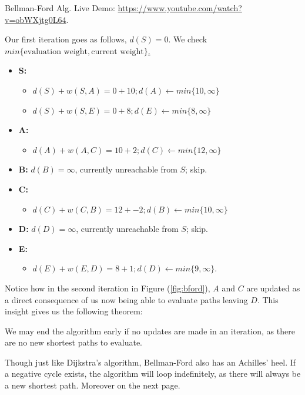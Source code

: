 \vspace{-1em}
\begin{Tip}
    Bellman-Ford Alg. Live Demo: \url{https://www.youtube.com/watch?v=obWXjtg0L64}.
\end{Tip}
\noindent
Our first iteration goes as follows, $d(S)=0$. We check \underline{$min\{\text{evaluation weight},\text{current weight}\}$.}
\begin{itemize}
    \item \textbf{S:}
    \vspace{-2em}
    \begin{itemize}
        \item [] $d(S)+w(S,A)=0+10; d(A)\gets min\{10,\infty\}$
        \item [] $d(S)+w(S,E)=0+8; d(E)\gets min\{8,\infty\}$
    \end{itemize}
    \item \textbf{A:}
    \vspace{-2em}
    \begin{itemize}
        \item [] $d(A)+w(A,C)=10+2; d(C)\gets min\{12,\infty\}$
    \end{itemize}
    \item \textbf{B:} \hspace{.5em} $d(B)=\infty$, currently unreachable from $S$; skip.
    \item \textbf{C:}
    \vspace{-2em}
    \begin{itemize}
        \item [] $d(C)+w(C,B)=12+-2; d(B)\gets min\{10,\infty\}$
    \end{itemize}
    \item \textbf{D:} \hspace{.5em} $d(D)=\infty$, currently unreachable from $S$; skip.
    \item \textbf{E:}
    \vspace{-2em}
    \begin{itemize}
        \item [] $d(E)+w(E,D)=8+1; d(D)\gets min\{9,\infty\}$.
    \end{itemize}
\end{itemize}
\noindent
Notice how in the second iteration in Figure (\ref{fig:bford}), $A$ and $C$ are updated as a direct consequence of us now being 
able to evaluate paths leaving $D$. This insight gives us the following theorem:

\begin{theo}

    We may end the algorithm early if no updates are made in an iteration, as there are no new shortest paths to evaluate.
\end{theo}
\noindent
Though just like Dijkstra's algorithm, Bellman-Ford also has an Achilles' heel. If a negative cycle exists, the algorithm will 
loop indefinitely, as there will always be a new shortest path. Moreover on the next page.

